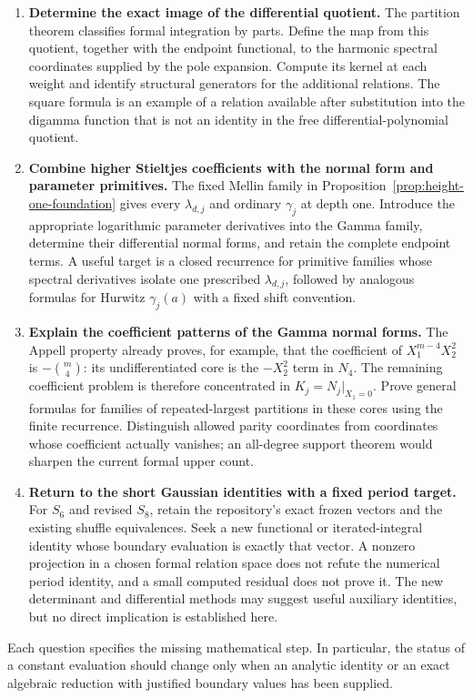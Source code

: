 \begin{enumerate}[leftmargin=*,label=\textbf{R\arabic*.}]
\item \textbf{Determine the exact image of the differential quotient.}
The partition theorem classifies formal integration by parts. Define the
map from this quotient, together with the endpoint functional, to the
harmonic spectral coordinates supplied by the pole expansion. Compute
its kernel at each weight and identify structural generators for the
additional relations. The square formula is an example of a relation
available after substitution into the digamma function that is not an
identity in the free differential-polynomial quotient.

\item \textbf{Combine higher Stieltjes coefficients with the normal
form and parameter primitives.}
The fixed Mellin family in Proposition~\ref{prop:height-one-foundation}
gives every $\lambda_{d,j}$ and ordinary $\gamma_j$ at depth one.
Introduce the appropriate logarithmic parameter derivatives into the
Gamma family, determine their differential normal forms, and retain the
complete endpoint terms. A useful target is a closed recurrence for
primitive families whose spectral derivatives isolate one prescribed
$\lambda_{d,j}$, followed by analogous formulas for Hurwitz
$\gamma_j(a)$ with a fixed shift convention.

\item \textbf{Explain the coefficient patterns of the Gamma normal
forms.}
The Appell property already proves, for example, that the coefficient of
$X_1^{m-4}X_2^2$ is $-\binom m4$: its undifferentiated core is the
$-X_2^2$ term in $N_4$. The remaining coefficient problem is therefore
concentrated in $K_j=N_j|_{X_1=0}$. Prove general formulas for families
of repeated-largest partitions in these cores using the finite recurrence.
Distinguish allowed parity coordinates from coordinates whose coefficient
actually vanishes; an all-degree support theorem would sharpen the
current formal upper count.

\item \textbf{Return to the short Gaussian identities with a fixed
period target.}
For $S_6$ and revised $S_8$, retain the repository's exact frozen
vectors and the existing shuffle equivalences. Seek a new functional or
iterated-integral identity whose boundary evaluation is exactly that
vector. A nonzero projection in a chosen formal relation space does not
refute the numerical period identity, and a small computed residual does
not prove it. The new determinant and differential methods may suggest
useful auxiliary identities, but no direct implication is established here.
\end{enumerate}

Each question specifies the missing mathematical step. In particular,
the status of a constant evaluation should change only when an analytic
identity or an exact algebraic reduction with justified boundary values
has been supplied.
